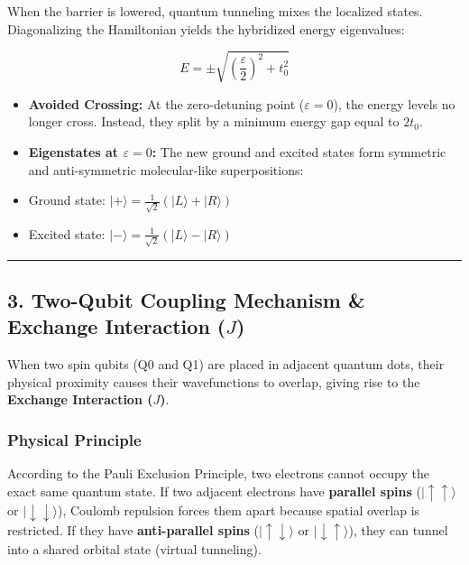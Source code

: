 \documentclass[
]{article}
\providecommand{\tightlist}{%
  \setlength{\itemsep}{0pt}\setlength{\parskip}{0pt}}
\begin{document}
When the barrier is lowered, quantum tunneling mixes the localized
states. Diagonalizing the Hamiltonian yields the hybridized energy
eigenvalues:

\[E = \pm \sqrt{\left(\frac{\varepsilon}{2}\right)^2 + t_0^2}\]

\begin{itemize}
\tightlist
\item
  \textbf{Avoided Crossing:} At the zero-detuning point
  (\(\varepsilon = 0\)), the energy levels no longer cross. Instead,
  they split by a minimum energy gap equal to \(2t_0\).
\item
  \textbf{Eigenstates at \(\varepsilon = 0\):} The new ground and
  excited states form symmetric and anti-symmetric molecular-like
  superpositions:
\item
  Ground state:
  \(|+\rangle = \frac{1}{\sqrt{2}}(|L\rangle + |R\rangle)\)
\item
  Excited state:
  \(|-\rangle = \frac{1}{\sqrt{2}}(|L\rangle - |R\rangle)\)
\end{itemize}

\begin{center}\rule{0.5\linewidth}{0.5pt}\end{center}

\subsection{\texorpdfstring{3. Two-Qubit Coupling Mechanism \& Exchange
Interaction
(\(J\))}{3. Two-Qubit Coupling Mechanism \& Exchange Interaction (J)}}\label{two-qubit-coupling-mechanism-exchange-interaction-j}

When two spin qubits (Q0 and Q1) are placed in adjacent quantum dots,
their physical proximity causes their wavefunctions to overlap, giving
rise to the \textbf{Exchange Interaction (\(J\))}.

\subsubsection{Physical Principle}\label{physical-principle}

According to the Pauli Exclusion Principle, two electrons cannot occupy
the exact same quantum state. If two adjacent electrons have
\textbf{parallel spins} (\(|\uparrow\uparrow\rangle\) or
\(|\downarrow\downarrow\rangle\)), Coulomb repulsion forces them apart
because spatial overlap is restricted. If they have
\textbf{anti-parallel spins} (\(|\uparrow\downarrow\rangle\) or
\(|\downarrow\uparrow\rangle\)), they can tunnel into a shared orbital
state (virtual tunneling).
\end{document}
